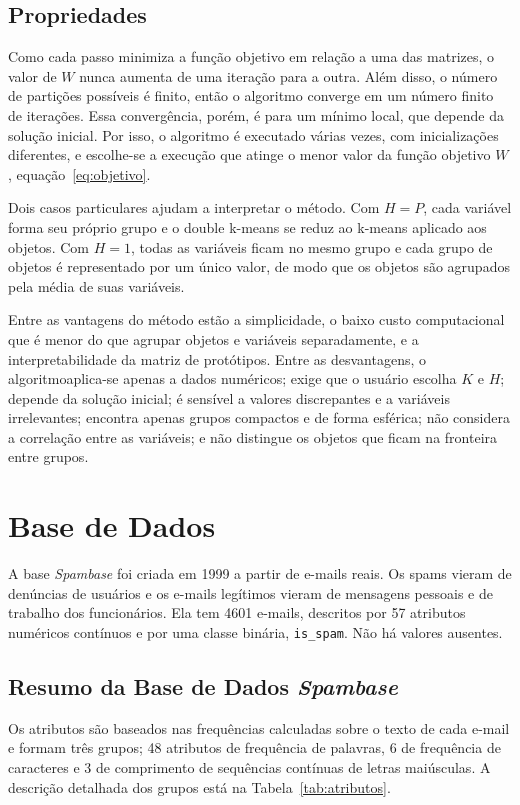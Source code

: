 \documentclass[12pt,reqno]{amsart}
\begin{document}
\subsection{Propriedades}
Como cada passo minimiza a função objetivo em relação a uma das matrizes, o valor de $W$ nunca
aumenta de uma iteração para a outra. Além disso, o número de partições possíveis é finito, então
o algoritmo converge em um número finito de iterações. Essa convergência, porém, é para um mínimo
local, que depende da solução inicial. Por isso, o algoritmo é executado várias vezes, com
inicializações diferentes, e escolhe-se a execução que atinge o menor valor da função objetivo
$W$, equação~\eqref{eq:objetivo}.

Dois casos particulares ajudam a interpretar o método. Com $H=P$, cada variável forma seu
próprio grupo e o double k-means se reduz ao k-means aplicado aos objetos. Com $H=1$, todas as
variáveis ficam no mesmo grupo e cada grupo de objetos é representado por um único valor, de
modo que os objetos são agrupados pela média de suas variáveis.

Entre as vantagens do método estão a simplicidade, o baixo custo computacional que é menor do que
agrupar objetos e variáveis separadamente, e a interpretabilidade da matriz de protótipos.
Entre as desvantagens, o algoritmoaplica-se apenas a dados numéricos; exige que o usuário escolha $K$ e $H$;
depende da solução inicial; é sensível a valores discrepantes e a variáveis irrelevantes;
encontra apenas grupos compactos e de forma esférica; não considera a correlação entre as
variáveis; e não distingue os objetos que ficam na fronteira entre grupos.


\section{Base de Dados}

A base \emph{Spambase} foi criada em 1999 a partir de e-mails reais. Os spams vieram de denúncias de usuários e os e-mails legítimos vieram de mensagens pessoais e de trabalho dos funcionários. Ela tem 4601 e-mails, descritos por 57 atributos numéricos contínuos e por uma classe binária, \texttt{is\_spam}. Não há valores ausentes. \cite{spambase}

\subsection{Resumo da Base de Dados \emph{Spambase}}

Os atributos são baseados nas frequências calculadas sobre o texto de cada e-mail e formam três grupos; 48 atributos de frequência de palavras, 6 de frequência de caracteres e 3 de comprimento de sequências contínuas de letras maiúsculas. A descrição detalhada dos grupos está na
Tabela~\ref{tab:atributos}.
\end{document}
